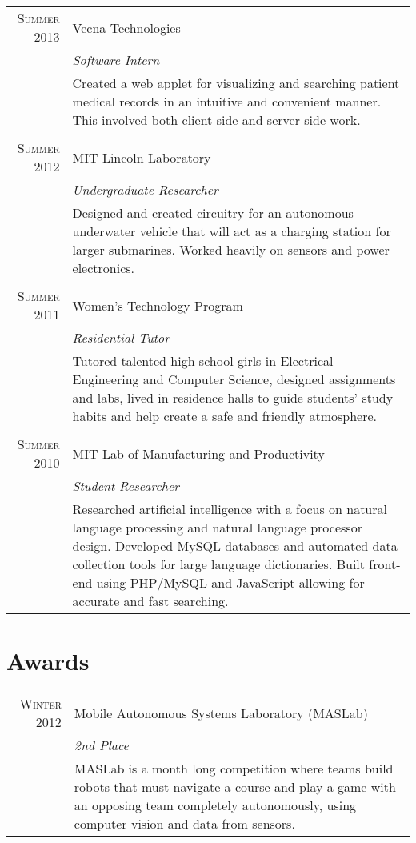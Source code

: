 \documentclass[a4paper,10pt]{article}
\begin{document}
\begin{tabular}{r|p{11cm}}
\textsc{Summer 2013} & Vecna Technologies \\&\emph{Software Intern}\\&\footnotesize{Created a web applet for visualizing and searching patient medical records in an intuitive and convenient manner. This involved both client side and server side work.}\\\multicolumn{2}{c}{} \\
\textsc{Summer 2012} & MIT Lincoln Laboratory \\&\emph{Undergraduate Researcher}\\&\footnotesize{Designed and created circuitry for an autonomous underwater vehicle that will act as a charging station for larger submarines. Worked heavily on sensors and power electronics.}\\\multicolumn{2}{c}{} \\
\textsc{Summer 2011} & Women's Technology Program\\&\emph{Residential Tutor}\\&\footnotesize{Tutored talented high school girls in Electrical Engineering and Computer Science, designed assignments and labs, lived in residence halls to guide students' study habits and help create a safe and friendly atmosphere.}\\\multicolumn{2}{c}{} \\
\textsc{Summer 2010} & MIT Lab of Manufacturing and Productivity\\&\emph{Student Researcher}\\&\footnotesize{Researched artificial intelligence with a focus on natural language processing and natural language processor design. Developed MySQL databases and automated data collection tools for large language dictionaries. Built front-end using PHP/MySQL and JavaScript allowing for accurate and fast searching.}
\end{tabular}

\section{Awards}
\begin{tabular}{rp{11cm}}
\textsc{Winter 2012} & Mobile Autonomous Systems Laboratory (MASLab)\\&\emph{2nd Place}\\&\footnotesize{MASLab is a month long competition where teams build robots that must navigate a course and play a game with an opposing team completely autonomously, using computer vision and data from sensors.}
\end{tabular}
\end{document}
